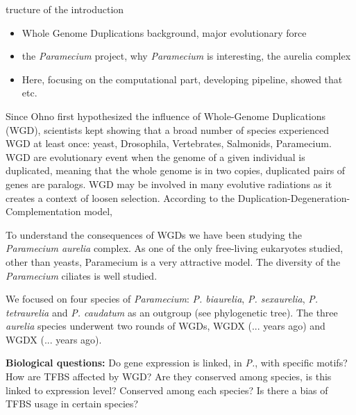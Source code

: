 tructure of the introduction
\newline
\begin{itemize}
\item Whole Genome Duplications background, major evolutionary force
\item the \textit{Paramecium} project, why \textit{Paramecium} is interesting, the aurelia complex
\item Here, focusing on the computational part, developing pipeline, showed that etc.
\end{itemize}

Since Ohno first hypothesized the influence of Whole-Genome Duplications (WGD), scientists kept showing that a broad number of species experienced WGD at least once: yeast, Drosophila, Vertebrates, Salmonids, Paramecium. WGD are evolutionary event when the genome of a given individual is duplicated, meaning that the whole genome is in two copies, duplicated pairs of genes are paralogs. WGD may be involved in many evolutive radiations as it creates a context of loosen selection. According to the Duplication-Degeneration-Complementation model,

To understand the consequences of WGDs we have been studying the \textit{Paramecium aurelia} complex. As one of the only free-living eukaryotes studied, other than yeasts, Paramecium is a very attractive model. The diversity of the \textit{Paramecium} ciliates is well studied.

We focused on four species of \textit{Paramecium}: \textit{P. biaurelia}, \textit{P. sexaurelia}, \textit{P. tetraurelia} and \textit{P. caudatum} as an outgroup (see phylogenetic tree). The three \textit{aurelia} species underwent two rounds of WGDs, WGDX (... years ago) and WGDX (... years ago).

\textbf{Biological questions:} Do gene expression is linked, in \textit{P.}, with specific motifs? How are TFBS affected by WGD? Are they conserved among species, is this linked to expression level? Conserved among each species? Is there a bias of TFBS usage in certain species?